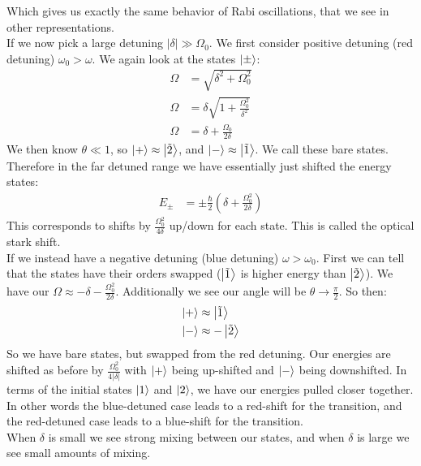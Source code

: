 Which gives us exactly the same behavior of Rabi oscillations, that we see in other representations.\\
If we now pick a large detuning $|\delta| \gg \Omega_0$. We first consider positive detuning (red detuning) $\omega_0 > \omega$. We again look at the states $\ket{\pm}$:
\begin{align*}
	\Omega &= \sqrt{\delta^2 + \Omega_0^2} \\
	\Omega &= \delta\sqrt{1 + \frac{\Omega_0^2}{\delta^2}} \\
	\Omega &= \delta + \frac{\Omega_0}{2\delta}
\end{align*}
We then know $\theta\ll 1$, so $\ket{+} \approx \ket{\tilde{2}}$, and $\ket{-} \approx \ket{\tilde{1}}$. We call these bare states. Therefore in the far detuned range we have essentially just shifted the energy states:
\begin{align*}
	E_\pm &= \pm \frac{\hbar}{2}\left(\delta + \frac{\Omega_0^2}{2\delta}\right) 
\end{align*}
This corresponds to shifts by $\frac{\Omega_0^2}{4\delta}$ up/down for each state. This is called the optical stark shift. \\
If we instead have a negative detuning (blue detuning) $\omega > \omega_0$. First we can tell that the states have their orders swapped ($\ket{\tilde{1}}$ is higher energy than $\ket{\tilde{2}}$). 
We have our $\Omega \approx -\delta -\frac{\Omega_0^2}{2\delta}$. Additionally we see our angle will be $\theta \to \frac{\pi}{2}$. So then:
\begin{align*}
	\ket{+} &\approx \ket{\tilde{1}} \\
	\ket{-} &\approx -\ket{\tilde{2}} \\
\end{align*}
So we have bare states, but swapped from the red detuning. Our energies are shifted as before by $\frac{\Omega_0^2}{4|\delta|}$ with $\ket{+}$ being up-shifted and $\ket{-}$ being downshifted. In terms of the initial states $\ket{1}$ and $\ket{2}$, we have our energies pulled closer together. In other words the blue-detuned case leads to a red-shift for the transition, and the red-detuned case leads to a blue-shift for the transition. \\
When $\delta$ is small we see strong mixing between our states, and when $\delta$ is large we see small amounts of mixing. \\
